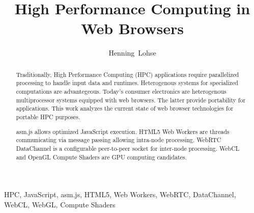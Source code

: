 \title{High Performance Computing in Web Browsers}
\author{Henning~Lohse}

%
{}

\maketitle


\begin{abstract}
Traditionally, High Performance Computing (HPC) applications require parallelized processing to handle input data and runtimes. Heterogenous systems for specialized computations are advantegeous. Today's consumer electronics are heterogenous multiprocessor systems equipped with web browsers. The latter provide portability for applications. This work analyzes the current state of web browser technologies for portable HPC purposes.

asm.js allows optimized JavaScript execution. HTML5 Web Workers are threads communicating via message passing allowing intra-node processing. WebRTC DataChannel is a configurable peer-to-peer socket for inter-node processing. WebCL and OpenGL Compute Shaders are GPU computing candidates.
\end{abstract}

\begin{IEEEkeywords}
HPC, JavaScript, asm.js, HTML5, Web Workers, WebRTC, DataChannel, WebCL, WebGL, Compute Shaders
\end{IEEEkeywords}